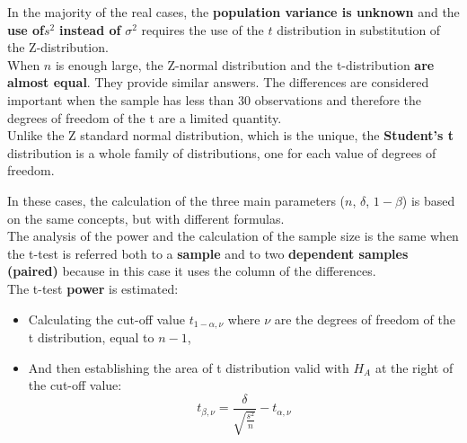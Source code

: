 
\begin{frame}
  \vspace*{.25cm}
  In the majority of the real cases, the \textbf{population variance is unknown} and the \textbf{use of}{\boldmath$s^2$} \textbf{instead of} {\boldmath$\sigma^2$} requires the use of the {\boldmath$t$} distribution in substitution of the Z-distribution.\\
  \vspace*{.5cm}
  When $ n $ is enough large, the Z-normal distribution and the t-distribution \textbf{are almost equal}. They provide similar answers. The differences are considered important when the sample has less than 30 observations and therefore the degrees of freedom of the t are a limited quantity.\\
  \vspace*{.5cm}
  Unlike the Z standard normal distribution, which is the unique, the \textbf{Student's t} distribution is a whole family of distributions, one for each value of degrees of freedom.
\end{frame}

\begin{frame}
  In these cases, the calculation of the three main parameters  ({\boldmath $ n $}, {\boldmath $ \delta $}, {\boldmath $ 1-\beta $}) is based on the same concepts, but with different formulas.\\
  \vspace*{.25cm}
  The analysis of the power and the calculation of the sample size is the same when the t-test is referred both to a \textbf{sample} and to two \textbf{dependent samples (paired)} because in this case it uses the column of the differences.\\
  \vspace*{.25cm}
  The t-test \textbf{power} is estimated:
  \begin{itemize}
    \item Calculating the cut-off value $ t_{1-\alpha,\nu} $ where $ \nu $ are the degrees of freedom of the t distribution, equal to {\boldmath $ n-1 $},
    \item And then establishing the area of t distribution valid with $ H_A $ at the right of the cut-off value:
    $$ t_{\beta,\nu} = \frac{\delta}{\sqrt{\frac{s^2}{n}}}-t_{\alpha,\nu} $$
\end{itemize}
\end{frame}

